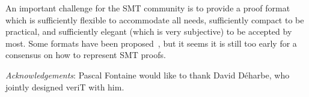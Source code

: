\documentclass{llncs}
\begin{document}
An important challenge for the SMT community is to provide a proof format which
is sufficiently flexible to accommodate all needs, sufficiently compact to be
practical, and sufficiently elegant (which is very subjective) to be accepted by
most.  Some formats have been proposed~\cite{}, but it seems it is still too early for a consensus on how to represent
SMT proofs.


\medskip
\emph{Acknowledgements}: Pascal Fontaine would like to thank David D\'{e}harbe,
who jointly designed veriT with him.




\end{document}
